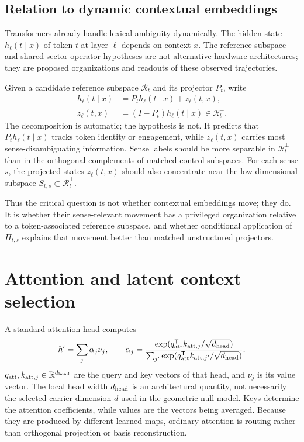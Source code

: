 \documentclass[
  aps,
  reprint,
  superscriptaddress,
  floatfix,
  nofootinbib,
  longbibliography
]{revtex4-2}
\newcommand{\R}{\mathbb{R}}
\newcommand{\T}{^{\mathsf{T}}}
\begin{document}
\subsection{Relation to dynamic contextual embeddings}
\label{sec:dynamic}

Transformers already handle lexical ambiguity dynamically. The hidden state
$h_\ell(t\mid x)$ of token $t$ at layer $\ell$ depends on context $x$.
The reference-subspace and shared-sector operator hypotheses are not
alternative hardware architectures; they are proposed organizations and
readouts of these observed trajectories.

Given a candidate reference subspace $\mathcal R_t$ and its projector $P_t$,
write
%
\begin{align}
\label{eq:layer-decomp}
h_\ell(t\mid x)
&=P_t h_\ell(t\mid x)+z_\ell(t,x),\\
z_\ell(t,x)&=(I-P_t)h_\ell(t\mid x)
\in\mathcal R_t^\perp.\nonumber
\end{align}
%
The decomposition is automatic; the hypothesis is not. It predicts that
$P_t h_\ell(t\mid x)$ tracks token identity or engagement, while
$z_\ell(t,x)$ carries most sense-disambiguating information. Sense labels
should be more separable in $\mathcal R_t^\perp$ than in the orthogonal
complements of matched control subspaces. For each sense $s$, the projected
states $z_\ell(t,x)$ should also concentrate near the low-dimensional
subspace $S_{t,s}\subset\mathcal R_t^\perp$.

Thus the critical question is not whether contextual embeddings move; they
do. It is whether their sense-relevant movement has a privileged organization
relative to a token-associated reference subspace, and whether conditional
application of $\Pi_{t,s}$ explains that movement better than matched
unstructured projectors.

\section{Attention and latent context selection}
\label{sec:attention}

A standard attention head computes
%
\begin{equation}
\label{eq:attention}
h'=\sum_j\alpha_j\nu_j,
\qquad
\alpha_j=
\frac{\exp(q_{\rm att}\T k_{{\rm att},j}/\sqrt{d_{\rm head}})}
{\sum_{j'}\exp(q_{\rm att}\T k_{{\rm att},j'}/\sqrt{d_{\rm head}})} .
\end{equation}
%
$q_{\rm att},k_{{\rm att},j}\in\R^{d_{\rm head}}$ are the query and key
vectors of that head, and $\nu_j$ is its value vector.  The local head width
$d_{\rm head}$ is an architectural
quantity, not necessarily the selected carrier dimension $d$ used in the
geometric null model.
Keys determine the attention coefficients, while values are the vectors being
averaged.  Because they are produced by different learned maps, ordinary
attention is routing rather than orthogonal projection or basis
reconstruction.
\end{document}
